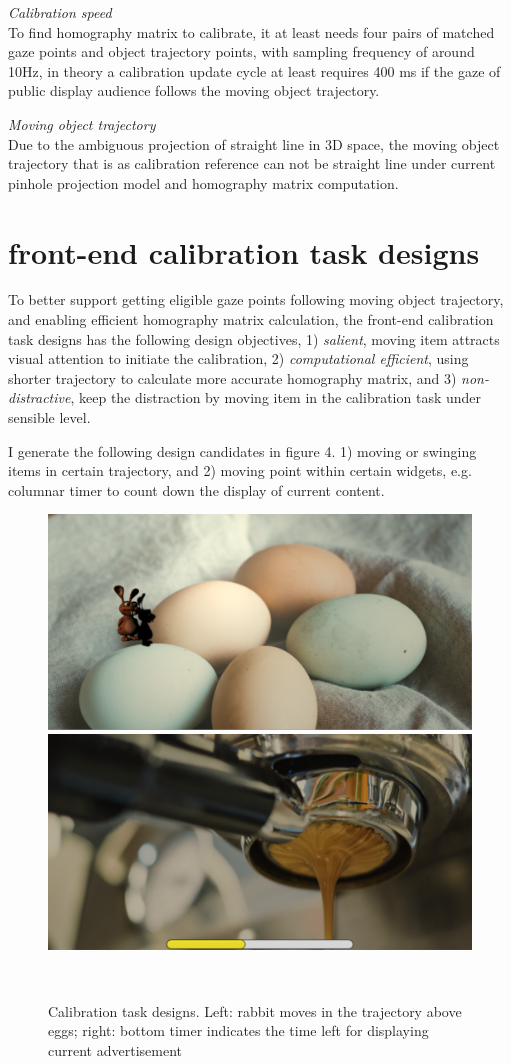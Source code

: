 \documentclass{sigchi}
\begin{document}
\textit{Calibration speed}\\
To find homography matrix to calibrate, it at least needs four pairs of matched gaze points and object trajectory points, with sampling frequency of around 10Hz, in theory a calibration update cycle at least requires 400 ms if the gaze of public display audience follows the moving object trajectory. 

\textit{Moving object trajectory}\\
Due to the ambiguous projection of straight line in 3D space, the moving object trajectory that is as calibration reference can not be straight line under current pinhole projection model and homography matrix computation.
\section{front-end calibration task designs}
To better support getting eligible gaze points following moving object trajectory, and enabling efficient homography matrix calculation, the front-end calibration task designs has the following design objectives, 1) \textit{salient}, moving item attracts visual attention to initiate the calibration, 2) \textit{computational efficient}, using shorter trajectory to calculate more accurate homography matrix, and 3) \textit{non-distractive}, keep the distraction by moving item in the calibration task under sensible level.

I generate the following design candidates in figure 4. 1) moving or swinging items in certain trajectory, and 2) moving point within certain widgets, e.g. columnar timer to count down the display of current content.
\begin{figure}[h!]
  \centering
  \includegraphics[width=0.47\columnwidth]{figures/EasterAds}\space\space \includegraphics[width=0.47\columnwidth]{figures/CoffeeAds}\\
\caption{Calibration task designs. Left: rabbit moves in the trajectory above eggs; right: bottom timer indicates the time left for displaying current advertisement}~\label{fig:figure2}
\end{figure}
\end{document}
